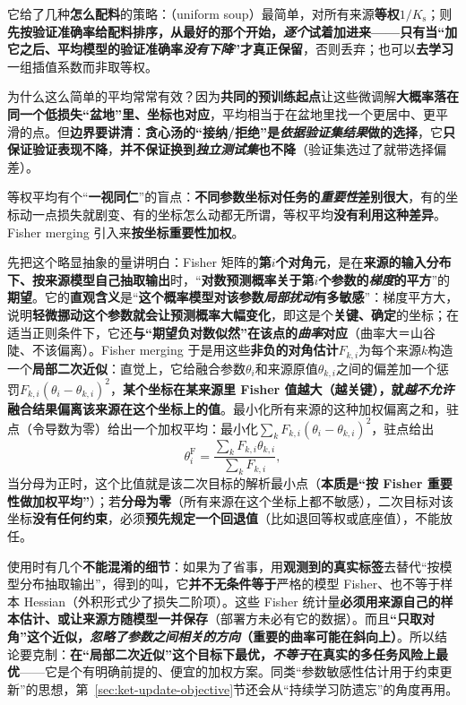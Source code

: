 它给了几种\textbf{怎么配料}的策略：（uniform soup）最简单，对所有来源\textbf{等权}$1/K_{\mathrm{s}}$；则\textbf{先按验证准确率给配料排序，从最好的那个开始，\emph{逐个}试着加进来——只有当“加它之后、平均模型的验证准确率\emph{没有下降}”才真正保留}，否则丢弃；也可以\textbf{去学习}一组插值系数而非取等权。

为什么这么简单的平均常常有效？因为\textbf{共同的预训练起点}让这些微调解\textbf{大概率落在同一个低损失“盆地”里、坐标也对应}，平均相当于在盆地里找一个更居中、更平滑的点。但\textbf{边界要讲清}：\textbf{贪心汤的“接纳/拒绝”是\emph{依据验证集结果}做的选择}，它\textbf{只保证验证表现不降}，\textbf{并不保证换到\emph{独立测试集}也不降}（验证集选过了就带选择偏差）。

等权平均有个“\textbf{一视同仁}”的盲点：\textbf{不同参数坐标对任务的\emph{重要性}差别很大}，有的坐标动一点损失就剧变、有的坐标怎么动都无所谓，等权平均\textbf{没有利用这种差异}。Fisher merging 引入来\textbf{按坐标重要性加权}。

先把这个略显抽象的量讲明白：Fisher 矩阵的\textbf{第$i$个对角元}，是在\textbf{来源的输入分布下、按来源模型自己抽取输出}时，“\textbf{对数预测概率关于第$i$个参数的\emph{梯度}的平方}”的\textbf{期望}。它的\textbf{直观含义}是“\textbf{这个概率模型对该参数\emph{局部扰动}有多敏感}”：梯度平方大，说明\textbf{轻微挪动这个参数就会让预测概率大幅变化}，即这是个\textbf{关键、确定}的坐标；在适当正则条件下，它还\textbf{与“期望负对数似然”在该点的\emph{曲率}对应}（曲率大＝山谷陡、不该偏离）。Fisher merging 于是用这些\textbf{非负的对角估计}$F_{k,i}$为每个来源$k$构造一个\textbf{局部二次近似}：直觉上，它给融合参数$\theta_i$和来源原值$\theta_{k,i}$之间的偏差加一个惩罚$F_{k,i}(\theta_i-\theta_{k,i})^2$，\textbf{某个坐标在某来源里 Fisher 值越大（越关键），就\emph{越不允许}融合结果偏离该来源在这个坐标上的值}。最小化所有来源的这种加权偏离之和，驻点（令导数为零）给出一个加权平均：最小化$\sum_k F_{k,i}(\theta_i-\theta_{k,i})^2$，驻点给出
\[
  \theta_i^{\mathrm{F}}
  =\frac{\sum_k F_{k,i}\theta_{k,i}}
         {\sum_k F_{k,i}},
\]
当分母为正时，这个比值就是该二次目标的解析最小点（\textbf{本质是“按 Fisher 重要性做加权平均”}）；若\textbf{分母为零}（所有来源在这个坐标上都不敏感），二次目标对该坐标\textbf{没有任何约束}，必须\textbf{预先规定一个回退值}（比如退回等权或底座值），不能放任。

使用时有几个\textbf{不能混淆的细节}：如果为了省事，用\textbf{观测到的真实标签}去替代“按模型分布抽取输出”，得到的叫，它\textbf{并不无条件等于}严格的模型 Fisher、也不等于样本 Hessian（外积形式少了损失二阶项）。这些 Fisher 统计量\textbf{必须用来源自己的样本估计、或让来源方随模型一并保存}（部署方未必有它的数据）。而且\textbf{“只取对角”这个近似，\emph{忽略了参数之间\emph{相关}的方向}（重要的曲率可能在斜向上）}。所以结论要克制：\textbf{在“局部二次近似”这个目标下最优，\emph{不等于}在真实的多任务风险上最优}——它是个有明确前提的、便宜的加权方案。同类“参数敏感性估计用于约束更新”的思想，第~\ref{sec:ket-update-objective}节还会从“持续学习防遗忘”的角度再用。

